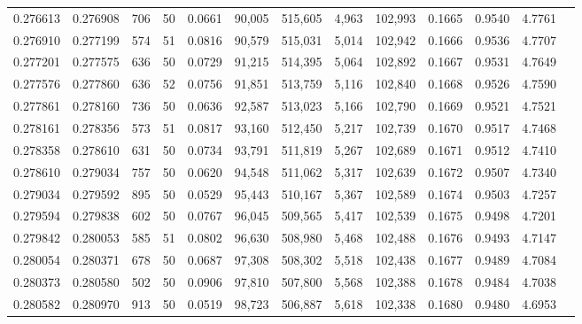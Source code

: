 \begin{tabular}{rrrrrrrrrrrrr}
0.276613 & 0.276908 &   706 &  50 &                                     0.0661 &  90,005 & 515,605 &   4,963 & 102,993 & 0.1665 & 0.9540 & 4.7761 \\
0.276910 & 0.277199 &   574 &  51 &                                     0.0816 &  90,579 & 515,031 &   5,014 & 102,942 & 0.1666 & 0.9536 & 4.7707 \\
0.277201 & 0.277575 &   636 &  50 &                                     0.0729 &  91,215 & 514,395 &   5,064 & 102,892 & 0.1667 & 0.9531 & 4.7649 \\
0.277576 & 0.277860 &   636 &  52 &                                     0.0756 &  91,851 & 513,759 &   5,116 & 102,840 & 0.1668 & 0.9526 & 4.7590 \\
0.277861 & 0.278160 &   736 &  50 &                                     0.0636 &  92,587 & 513,023 &   5,166 & 102,790 & 0.1669 & 0.9521 & 4.7521 \\
0.278161 & 0.278356 &   573 &  51 &                                     0.0817 &  93,160 & 512,450 &   5,217 & 102,739 & 0.1670 & 0.9517 & 4.7468 \\
0.278358 & 0.278610 &   631 &  50 &                                     0.0734 &  93,791 & 511,819 &   5,267 & 102,689 & 0.1671 & 0.9512 & 4.7410 \\
0.278610 & 0.279034 &   757 &  50 &                                     0.0620 &  94,548 & 511,062 &   5,317 & 102,639 & 0.1672 & 0.9507 & 4.7340 \\
0.279034 & 0.279592 &   895 &  50 &                                     0.0529 &  95,443 & 510,167 &   5,367 & 102,589 & 0.1674 & 0.9503 & 4.7257 \\
0.279594 & 0.279838 &   602 &  50 &                                     0.0767 &  96,045 & 509,565 &   5,417 & 102,539 & 0.1675 & 0.9498 & 4.7201 \\
0.279842 & 0.280053 &   585 &  51 &                                     0.0802 &  96,630 & 508,980 &   5,468 & 102,488 & 0.1676 & 0.9493 & 4.7147 \\
0.280054 & 0.280371 &   678 &  50 &                                     0.0687 &  97,308 & 508,302 &   5,518 & 102,438 & 0.1677 & 0.9489 & 4.7084 \\
0.280373 & 0.280580 &   502 &  50 &                                     0.0906 &  97,810 & 507,800 &   5,568 & 102,388 & 0.1678 & 0.9484 & 4.7038 \\
0.280582 & 0.280970 &   913 &  50 &                                     0.0519 &  98,723 & 506,887 &   5,618 & 102,338 & 0.1680 & 0.9480 & 4.6953 \\

\end{tabular}
